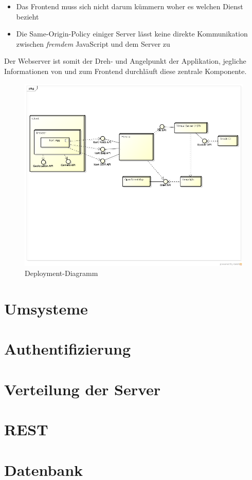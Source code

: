 \begin{itemize}
\item Das Frontend muss sich nicht darum kümmern woher es welchen Dienst bezieht
\item Die Same-Origin-Policy\cite{sop} einiger Server lässt keine direkte Kommunikation zwischen \emph{fremdem} JavaScript und dem Server zu
\end{itemize}

Der Webserver ist somit der Dreh- und Angelpunkt der Applikation, jegliche Informationen von und zum Frontend durchläuft diese zentrale Komponente.

\begin{figure}[H]
	\centering
	\includegraphics[width=\textwidth]{images/uml/deployment_diagram}
	\caption{Deployment-Diagramm}
	\label{deplyoyment-diagram}
\end{figure}

\section{Umsysteme}

\section{Authentifizierung}

\section{Verteilung der Server}

\section{REST}

\section{Datenbank}
